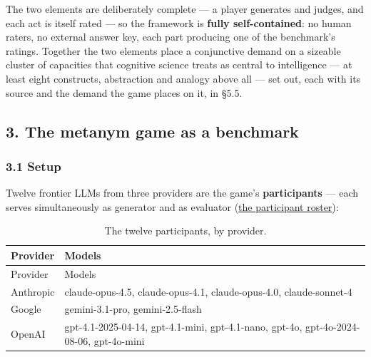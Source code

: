 The two elements are deliberately complete --- a player generates and judges, and each act is itself rated --- so the framework is \textbf{fully self-contained}: no human raters, no external answer key, each part producing one of the benchmark's ratings. Together the two elements place a conjunctive demand on a sizeable cluster of capacities that cognitive science treats as central to intelligence --- at least eight constructs, abstraction and analogy above all --- set out, each with its source and the demand the game places on it, in §5.5.

\subsection{3. The metanym game as a benchmark}\label{the-metanym-game-as-a-benchmark}

\subsubsection{3.1 Setup}\label{setup}

Twelve frontier LLMs from three providers are the game's \textbf{participants} --- each serves simultaneously as generator and as evaluator (\hyperref[tab-panel]{the participant roster}):

\protect{}\label{tab-panel}{}

\begin{longtable}[]{@{}
  >{\raggedright\arraybackslash}p{}
  >{\raggedright\arraybackslash}p{}@{}}
\caption{The twelve participants, by provider.}\tabularnewline
\toprule\noalign{}
\begin{minipage}[b]{\linewidth}\raggedright
Provider
\end{minipage} & \begin{minipage}[b]{\linewidth}\raggedright
Models
\end{minipage} \\
\midrule\noalign{}
\endfirsthead
\toprule\noalign{}
\begin{minipage}[b]{\linewidth}\raggedright
Provider
\end{minipage} & \begin{minipage}[b]{\linewidth}\raggedright
Models
\end{minipage} \\
\midrule\noalign{}
\endhead
\bottomrule\noalign{}
\endlastfoot
Anthropic & claude-opus-4.5, claude-opus-4.1, claude-opus-4.0, claude-sonnet-4 \\
Google & gemini-3.1-pro, gemini-2.5-flash \\
OpenAI & gpt-4.1-2025-04-14, gpt-4.1-mini, gpt-4.1-nano, gpt-4o, gpt-4o-2024-08-06, gpt-4o-mini \\
\end{longtable}

